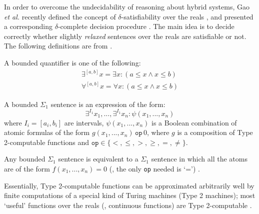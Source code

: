 In order to overcome the undecidability of reasoning about hybrid systems, Gao {\em et al.} recently
defined the concept of $\delta$-satisfiability over the reals \cite{DBLP:conf/lics/GaoAC12}, 
and presented a corresponding $\delta$-complete decision procedure \cite{DBLP:conf/cade/GaoAC12}. 
The main idea is to decide correctly whether slightly {\em relaxed} sentences over the reals 
are satisfiable or not. The following definitions are from \cite{DBLP:conf/lics/GaoAC12}.
\begin{definition}
A bounded quantifier is one of the following:
\[ \begin{array}{ll}
	\exists^{[a, b]} x  = \exists x : (a \le x \wedge x \le b) \\[1ex]
	\forall^{[a, b]} x  = \forall x : (a \le x \wedge x \le b)
\end{array} \]
\end{definition}

\begin{definition}
A bounded $\Sigma_1$ sentence is an expression of the form:
\begin{equation*} 
	\exists^{I_{1}} x_{1}, ..., \exists^{I_{1}} x_{n}: \psi(x_{1}, ..., x_{n})
\end{equation*}
where $I_{i} = [a_{i}, b_{i}]$ are intervals, $\psi(x_{1}, ..., x_{n})$ is a Boolean combination 
of atomic formulas of the form $g(x_{1}, ..., x_{n})\, \texttt{op} \, 0$, where $g$ is a composition 
of Type 2-computable functions and $\texttt{op} \in \{<, \le, >, \ge, =, \ne\}$. 
\end{definition}
\begin{remark}
Any bounded $\Sigma_1$ sentence is equivalent to a $\Sigma_1$ sentence in which all the atoms are
of the form $f(x_{1}, ..., x_{n}) = 0$ (\ie, the only \texttt{op} needed is `=') 
\cite{DBLP:conf/cade/GaoAC12}.
\end{remark}
Essentially, Type 2-computable functions can be approximated arbitrarily well by finite
computations of a special kind of Turing machines (Type 2 machines); most `useful' functions over 
the reals (\eg, continuous functions) are Type 2-computable \cite{kobook}.

